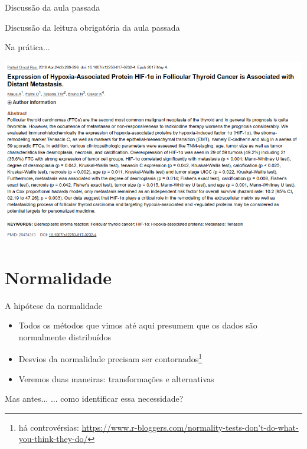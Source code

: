 \documentclass{beamer}
\begin{document}

\begin{frame}{\scriptsize Discussão da aula passada}
  \begin{block}{}
    Discussão da leitura obrigatória da aula passada
  \end{block}
\end{frame}

\begin{frame}[label=exemplo-varios]{\scriptsize Na prática...}
  \begin{center}
    \includegraphics[width=\textwidth]{Cap37-38/exemplo-varios}
  \end{center}
\end{frame}

\section{Normalidade}

\begin{frame}{\scriptsize A hipótese da normalidade}
  \begin{itemize}
    \footnotesize
  \item Todos os métodos que vimos até aqui presumem que os dados são normalmente distribuídos
  \item Desvios da normalidade precisam ser contornados\footnote{\tiny há controvérsias: {\tiny  \url{https://www.r-bloggers.com/normality-tests-don't-do-what-you-think-they-do/}}}
    \bigskip
  \item Veremos duas maneiras: transformações e alternativas
  \end{itemize}
    \bigskip
  \begin{block}{Mas antes...}
    \footnotesize
    ... como identificar essa necessidade?
  \end{block}
\end{frame}
\end{document}
